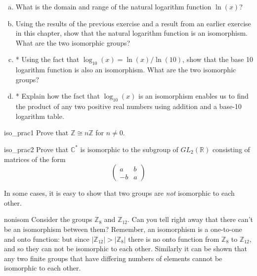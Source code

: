 \begin{exercise}{}
\begin{enumerate}[(a)]
\item
What is the domain and range of the natural logarithm function $\ln(x)$?
\item
Using the results of the previous exercise and a result from an earlier exercise in this chapter, show that the natural logarithm function is an isomorphism. What are the two isomorphic groups?
\item
* Using the fact that $\log_{10}(x) = \ln(x) / \ln(10)$, show that the base 10 logarithm function is also an isomorphism.  What are the two isomorphic groups?
\item 
* Explain how the fact that $\log_{10}(x)$ is an isomorphism enables us to find the product of any two positive real numbers using addition and a base-10 logarithm table. 
\end{enumerate}
\end{exercise}

\begin{exercise}{iso_prac1}
Prove that ${\mathbb Z} \cong n{\mathbb Z}$ for $n \neq 0$.
\end{exercise}
 
\begin{exercise}{iso_prac2}
Prove that ${\mathbb C}^\ast$ is isomorphic to the subgroup of $GL_2(
{\mathbb R} )$ consisting of matrices of the form 
\[
\begin{pmatrix}
a & b \\
-b & a
\end{pmatrix}
\]
\end{exercise}


In some cases, it is easy to show that two groups are \emph{not} isomorphic to each other.

\begin{example}{nonisom}
Consider the groups ${\mathbb Z}_8$ and ${\mathbb Z}_{12}$. Can you tell right away that there can't be an isomorphism between them?  Remember, an isomorphism is a one-to-one and onto function: but since 
$|{\mathbb Z}_{12}|>|{\mathbb Z}_{8}|$ there is no onto function from ${\mathbb Z}_8$ to ${\mathbb Z}_{12}$, and so they can not be isomorphic to each other.  Similarly it can be shown that any two finite groups that have differing numbers of elements cannot be isomorphic to each other.
\end{example}

